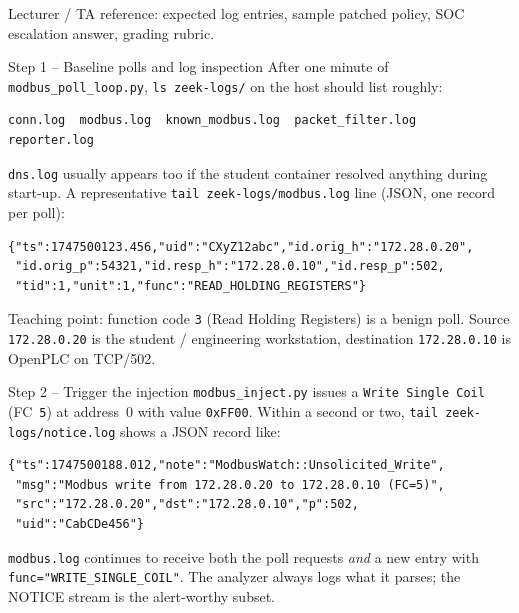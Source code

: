\documentclass[11pt,a4paper]{article}
\begin{document}
\labheader

\begin{goalbox}
Lecturer / TA reference: expected log entries, sample patched policy,
SOC escalation answer, grading rubric.
\end{goalbox}

\begin{solutionbox}{Step 1 -- Baseline polls and log inspection}
After one minute of \texttt{modbus\_poll\_loop.py}, \texttt{ls
zeek-logs/} on the host should list roughly:
\begin{lstlisting}
conn.log  modbus.log  known_modbus.log  packet_filter.log  reporter.log
\end{lstlisting}
\texttt{dns.log} usually appears too if the student container resolved
anything during start-up. A representative \texttt{tail
zeek-logs/modbus.log} line (JSON, one record per poll):
\begin{lstlisting}
{"ts":1747500123.456,"uid":"CXyZ12abc","id.orig_h":"172.28.0.20",
 "id.orig_p":54321,"id.resp_h":"172.28.0.10","id.resp_p":502,
 "tid":1,"unit":1,"func":"READ_HOLDING_REGISTERS"}
\end{lstlisting}
Teaching point: function code \texttt{3} (Read Holding Registers) is a
benign poll. Source \texttt{172.28.0.20} is the student / engineering
workstation, destination \texttt{172.28.0.10} is OpenPLC on TCP/502.
\end{solutionbox}

\begin{solutionbox}{Step 2 -- Trigger the injection}
\texttt{modbus\_inject.py} issues a \texttt{Write Single Coil}
(FC~\texttt{5}) at address~0 with value \texttt{0xFF00}. Within a
second or two, \texttt{tail zeek-logs/notice.log} shows a JSON record
like:
\begin{lstlisting}
{"ts":1747500188.012,"note":"ModbusWatch::Unsolicited_Write",
 "msg":"Modbus write from 172.28.0.20 to 172.28.0.10 (FC=5)",
 "src":"172.28.0.20","dst":"172.28.0.10","p":502,
 "uid":"CabCDe456"}
\end{lstlisting}
\texttt{modbus.log} continues to receive both the poll requests
\emph{and} a new entry with \texttt{func="WRITE\_SINGLE\_COIL"}. The
analyzer always logs what it parses; the NOTICE stream is the
alert-worthy subset.
\end{solutionbox}
\end{document}
